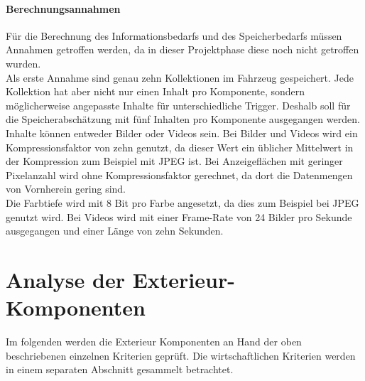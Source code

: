 \paragraph{Berechnungsannahmen}
Für die Berechnung des Informationsbedarfs und des Speicherbedarfs müssen Annahmen getroffen werden, da in dieser Projektphase diese noch nicht getroffen wurden. \\
Als erste Annahme sind genau zehn Kollektionen im Fahrzeug gespeichert. Jede Kollektion hat aber nicht nur einen Inhalt pro Komponente, sondern möglicherweise angepasste Inhalte für unterschiedliche Trigger. Deshalb soll für die Speicherabschätzung mit fünf Inhalten pro Komponente ausgegangen werden.\\
Inhalte können entweder Bilder oder Videos sein.
Bei Bilder und Videos wird ein Kompressionsfaktor von zehn genutzt, da dieser Wert ein üblicher Mittelwert in der Kompression zum Beispiel mit JPEG ist. Bei Anzeigeflächen mit geringer Pixelanzahl wird ohne Kompressionsfaktor gerechnet, da dort die Datenmengen von Vornherein gering sind. \\
Die Farbtiefe wird mit 8 Bit pro Farbe angesetzt, da dies zum Beispiel bei JPEG genutzt wird.
Bei Videos wird mit einer Frame-Rate von 24 Bilder pro Sekunde ausgegangen und einer Länge von zehn Sekunden.
\section{Analyse der Exterieur-Komponenten}
Im folgenden werden die Exterieur Komponenten an Hand der oben beschriebenen einzelnen Kriterien geprüft. Die wirtschaftlichen Kriterien werden in einem separaten Abschnitt gesammelt betrachtet. 
